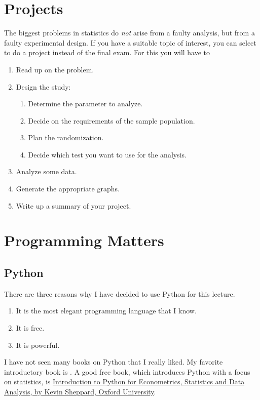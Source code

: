 \section{Projects}

The biggest problems in statistics do \emph{not} arise from a faulty analysis, but from a faulty experimental design. If you have a suitable topic of interest, you can select to do a project instead of the final exam. For this you will have to

\begin{enumerate}
  \item Read up on the problem.
  \item Design the study:

  \begin{enumerate}
    \item Determine the parameter to analyze.
    \item Decide on the requirements of the sample population.
    \item Plan the randomization.
    \item Decide which test you want to use for the analysis.
  \end{enumerate}

  \item Analyze some data.
  \item Generate the appropriate graphs.
  \item Write up a summary of your project.
\end{enumerate}

\section{Programming Matters}

\subsection{Python}


There are three reasons why I have decided to use Python for this lecture.

\begin{enumerate}
  \item It is the most elegant programming language that I know.
  \item It is free.
  \item It is powerful.
\end{enumerate}

I have not seen many books on Python that I really liked. My favorite introductory book is \cite{Harms2010}.
A good free book, which introduces Python with a focus on statistics, is \href{http://www.kevinsheppard.com/images/0/09/Python_introduction.pdf} {Introduction to Python for Econometrics, Statistics and Data Analysis, by Kevin Sheppard, Oxford University}.

